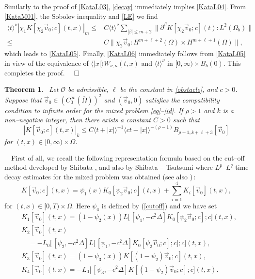 \documentclass[12pt]{amsart}
\newcommand{\pa}{\partial}
\newcommand{\norm}[2]{\|#1 \!:\! #2\|}
\newtheorem{theorem}{Theorem}[section]
\numberwithin{equation}{section}
\begin{document}
Similarly to the proof of \eqref{KataL03}, \eqref{decay}
immediately implies \eqref{KataL04}. 
From \eqref{KataM01}, the Sobolev inequality and \eqref{LE}
we find
\begin{align*}
\langle t\rangle^\nu|\chi_1 K[\chi_2 \vec{v}_0; c](t,x)|_m
\le & C\langle t\rangle^\nu
 \sum_{|\beta|\le m+2}\norm{\pa^\beta K[\chi_2 \vec{v}_0; c](t)}{L^2(\Omega_b)}\\
\le & C\norm{\chi_2 \vec{v}_0}{H^{m+\ell+2}(\Omega)\times H^{m+\ell+1}(\Omega)},
\end{align*}
which leads to \eqref{KataL05}.
Finally, \eqref{KataL06} immediately follows from \eqref{KataL05} in view of
the equivalence of $\langle{|x|}\rangle W_{\nu, \kappa}(t,x)$ 
and $\langle t\rangle^\nu$ in $[0,\infty)\times B_b(0)$.
This completes the proof.\hfill$\qed$
\begin{theorem}\ \label{main1}
Let ${\mathcal O}$ be admissible, 
$\ell$ be the constant in \eqref{obstacle},
and $c>0$.
Suppose that
$\vec{v}_0\in (C_0^\infty(\overline{\Omega}))^2$ and $(\vec{v}_0,0)$ satisfies the
compatibility condition to infinite order for the mixed problem \eqref{eq}--\eqref{id}.
If $\rho>1$ and $k$ is a non--negative integer, then
there exists a constant $C>0$ such that
\begin{equation}\label{m1}
|K[\vec{v}_0; c](t,x)|_k
  \le C\langle t+|x| \rangle^{-1} \langle ct -|x| \rangle^{-(\rho-1)}
B_{\rho+1, k+\ell+3}[\vec{v}_0]
\end{equation}
for $(t,x)\in [0,\infty)\times \Omega$.
\end{theorem}

\ \
First of all, we recall the following representation formula
based on the cut--off method developed by Shibata \cite{Shi83}, and also
by Shibata -- Tsutsumi \cite{ShiTsu86} where $L^p$--$L^q$ time decay estimates for the mixed
problem was obtained (see also \cite{Kub06})\,:
\begin{equation}\label{homo}
K[\vec{v}_0; c](t,x)=\psi_1(x) K_0[\psi_2 \vec{v}_0; c](t,x)
{}+\sum_{i=1}^4 K_i[\vec{v}_0](t,x),
\end{equation}
for $(t,x)\in [0,T)\times \Omega$.
Here $\psi_a$ is defined by (\ref{cutoff}) and we have set
\begin{align}\label{K1}
& K_1[\vec{v}_0](t,x)=(1-\psi_2(x))L\bigl[\,[\psi_1,-c^2\Delta]
K_0[\psi_2 \vec{v}_0;c];c\bigr](t,x),
\\ \label{K2}
&K_2[\vec{v}_0](t,x)\\
\nonumber
& \quad 
=-L_0\bigl[\,[\psi_2,-c^2\Delta]
  L\bigl[\,[\psi_1,-c^2\Delta]
             K_0[\psi_2 \vec{v}_0; c];c\bigr]; c\bigr](t,x),
\\ \label{K3}
& K_3[\vec{v}_0](t,x)=(1-\psi_3(x)) K[(1-\psi_2) \vec{v}_0; c](t,x),
\\ \label{K4}
& K_4[\vec{v}_0](t,x)=-L_0\bigl[\,[\psi_3,-c^2\Delta] K[(1-\psi_2)
\vec{v}_0;c]; c\bigr](t,x).
\end{align}
\end{document}
